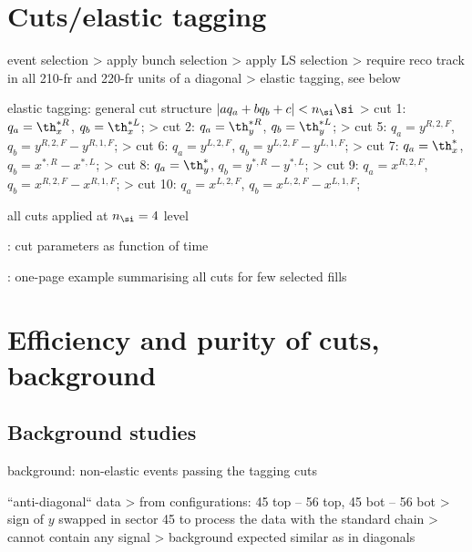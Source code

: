 \chapter[cuts]{Cuts/elastic tagging}

\> event selection
\>> apply bunch selection
\>> apply LS selection
\>> require reco track in all 210-fr and 220-fr units of a diagonal
\>> elastic tagging, see below

\> elastic tagging: general cut structure $| a q_a + b q_b + c| < n_\si  \si$
\>> cut 1: $q_a = \th_x^{*R}$, $q_b = \th_x^{*L}$; 
\>> cut 2: $q_a = \th_y^{*R}$, $q_b = \th_y^{*L}$; 
\>> cut 5: $q_a = y^{R,2,F}$, $q_b = y^{R,2,F} - y^{R,1,F}$; 
\>> cut 6: $q_a = y^{L,2,F}$, $q_b = y^{L,2,F} - y^{L,1,F}$; 
\>> cut 7: $q_a = \th^*_{x}$, $q_b = x^{*,R} - x^{*,L}$; 
\>> cut 8: $q_a = \th^*_{y}$, $q_b = y^{*,R} - y^{*,L}$; 
\>> cut 9: $q_a = x^{R,2,F}$, $q_b = x^{R,2,F} - x^{R,1,F}$; 
\>> cut 10: $q_a = x^{L,2,F}$, $q_b = x^{L,2,F} - x^{L,1,F}$; 

\> all cuts applied at $n_\si = 4$ level

\>  : cut parameters as function of time

\> : one-page example summarising all cuts for few selected fills



\chapter[cut-eff-bckg]{Efficiency and purity of cuts, background}

\section{Background studies}

\> background: non-elastic events passing the tagging cuts

\> ``anti-diagonal`` data
\>> from configurations: 45 top -- 56 top, 45 bot -- 56 bot
\>> sign of $y$ swapped in sector 45 to process the data with the standard chain
\>> cannot contain any signal
\>> background expected similar as in diagonals

